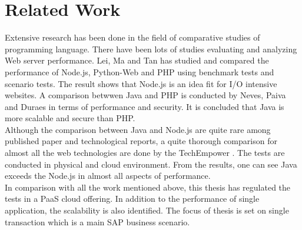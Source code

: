 \chapter{Related Work}
Extensive research has been done in the field of comparative studies of programming language. There have been lots of studies evaluating and analyzing Web server performance. Lei, Ma and Tan has studied and compared the performance of Node.js, Python-Web and PHP using benchmark tests and scenario tests\citep{node-related}. The result shows that Node.js is an idea fit for I/O intensive websites. A comparison betwwen Java and PHP is conducted by Neves, Paiva and Duraes in terms of performance and security\citep{java-related}. It is concluded that Java is more scalable and secure than PHP. \\
Although the comparison between Java and Node.js are quite rare among published paper and technological reports, a quite thorough comparison for almost all the web technologies are done by the TechEmpower \cite{Benchmark}. The tests are conducted in physical and cloud environment. From the results, one can see Java exceeds the Node.js in almost all aspects of performance. \\
In comparison with all the work mentioned above, this thesis has regulated the tests in a PaaS cloud offering. In addition to the performance of single application, the scalability is also identified. The focus of thesis is set on single transaction which is a main SAP business scenario. 